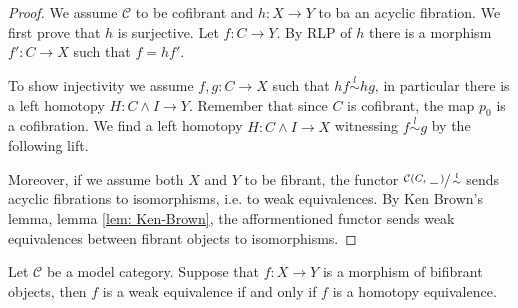 \documentclass[../thesis.tex]{subfiles}
\begin{document}
            \begin{proof}
                We assume $\mathcal{C}$ to be cofibrant and $h:X\rightarrow Y$ to ba an acyclic fibration. We first prove that $h$ is surjective. Let $f:C\rightarrow Y$. By RLP of $h$ there is a morphism $f':C\rightarrow X$ such that $f = hf'$.
                \begin{center}
                \end{center}
                
                To show injectivity we assume $f,g:C\rightarrow X$ such that $hf\overset{l}{\sim} hg$, in particular there is a left homotopy $H:C\wedge I \rightarrow Y$. Remember that since $C$ is cofibrant, the map $p_0$ is a cofibration. We find a left homotopy $H:C\wedge I \rightarrow X$ witnessing $f\overset{l}{\sim} g$ by the following lift.
                \begin{center}
                \end{center}

                Moreover, if we assume both $X$ and $Y$ to be fibrant, the functor $\sfrac{\mathcal{C}(C,\hspace{0.05cm}\underline{\hspace{0.2cm}}\hspace{0.05cm})}{\overset{l}{\sim}}$ sends acyclic fibrations to isomorphisms, i.e. to weak equivalences. By Ken Brown's lemma, lemma \ref{lem: Ken-Brown}, the afformentioned functor sends weak equivalences between fibrant objects to isomorphisms.
            \end{proof}

            \begin{thm}\label{thm: Whitehead}
                Let $\mathcal{C}$ be a model category. Suppose that $f : X \rightarrow Y$ is a morphism of bifibrant objects, then $f$ is a weak equivalence if and only if $f$ is a homotopy equivalence.
            \end{thm}
\end{document}
